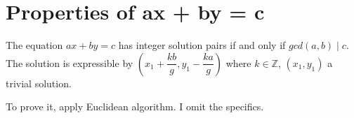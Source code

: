 \section{Properties of ax + by = c}

\begin{theorem}
  The equation $ax + by = c$ has integer solution pairs if and only if $gcd(a, b)\mid c$. The solution is expressible by $(x_{1} + \dfrac{kb}{g}, y_{1} - \dfrac{ka}{g})$ where $k\in \mathbb{Z}$, $(x_{1}, y_{1})$ a trivial solution.
\end{theorem}

\noindent
To prove it, apply Euclidean algorithm. I omit the specifics.